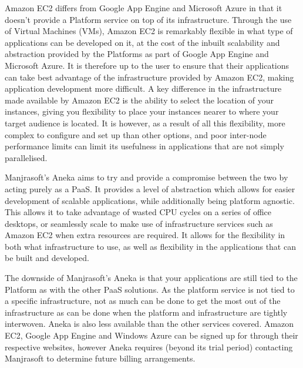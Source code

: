 Amazon EC2 differs from Google App Engine and Microsoft Azure in that it doesn't provide a Platform service on top of its infrastructure. Through the use of Virtual Machines (VMs), Amazon EC2 is remarkably flexible in what type of applications can be developed on it, at the cost of the inbuilt scalability and abstraction provided by the Platforms as part of Google App Engine and Microsoft Azure. It is therefore up to the user to ensure that their applications can take best advantage of the infrastructure provided by Amazon EC2, making application development more difficult. A key difference in the infrastructure made available by Amazon EC2 is the ability to select the location of your instances, giving you flexibility to place your instances nearer to where your target audience is located. It is however, as a result of all this flexibility, more complex to configure and set up than other options, and poor inter-node performance limits can limit its usefulness in applications that are not simply parallelised.  

Manjrasoft's Aneka aims to try and provide a compromise between the two by acting purely as a PaaS. It provides a level of abstraction which allows for easier development of scalable applications, while additionally being platform agnostic. This allows it to take advantage of wasted CPU cycles on a series of office desktops, or seamlessly scale to make use of infrastructure services such as Amazon EC2 when extra resources are required. It allows for the flexibility in both what infrastructure to use, as well as flexibility in the applications that can be built and developed. 

The downside of Manjrasoft's Aneka is that your applications are still tied to the Platform as with the other PaaS solutions. As the platform service is not tied to a specific infrastructure, not as much can be done to get the most out of the infrastructure as can be done when the platform and infrastructure are tightly interwoven. Aneka is also less available than the other services covered. Amazon EC2, Google App Engine and Windows Azure can be signed up for through their respective websites, however Aneka requires (beyond its trial period) contacting Manjrasoft to determine future billing arrangements.
